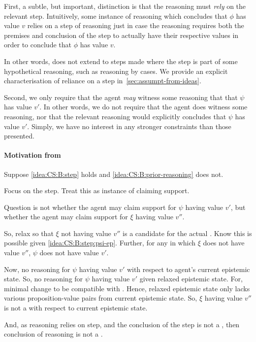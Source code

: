 \begin{note}
  First, a subtle, but important, distinction is that the reasoning must \emph{rely} on the relevant step.
  Intuitively, some instance of reasoning which concludes that \(\phi\) has value \(v\) relies on a step of reasoning just in case the reasoning requires both the premises and conclusion of the step to actually have their respective values in order to conclude that \(\phi\) has value \(v\).

  In other words, \ideaCSB{} does not extend to steps made where the step is part of some hypothetical reasoning, such as reasoning by cases.
  We provide an explicit characterisation of reliance on a step in~\autoref{sec:assumpt-from-ideas}.
\end{note}

\begin{note}
  Second, we only require that the agent \emph{may} witness some reasoning that \emph{} that \(\psi\) has value \(v'\).
  In other words, we do not require that the agent does witness some reasoning, nor that the relevant reasoning would explicitly concludes that \(\psi\) has value \(v'\).
  Simply, we have no interest in any stronger constraints than those presented.
\end{note}


\paragraph{Motivation from \ideaCSA{}}

\begin{note}
  Suppose \ref{idea:CS:B:step} holds and \ref{idea:CS:B:prior-reasoning} does not.


  Focus on the step.
  Treat this as instance of claiming support.

  Question is not whether the agent may claim support for \(\psi\) having value \(v'\), but whether the agent may claim support for \(\xi\) having value \(v''\).

  So, relax so that \(\xi\) not having value \(v''\) is a candidate for the actual \world{}.
  Know this is possible given \ref{idea:CS:B:step:psi-ep}.
  Further, for any \epAdv{} \world{} in which \(\xi\) does not have value \(v''\), \(\psi\) does not have value \(v'\).

  Now, no reasoning for \(\psi\) having value \(v'\) with respect to agent's current epistemic state.
  So, no reasoning for \(\psi\) having value \(v'\) given relaxed epistemic state.
  For, minimal change to be compatible with \epAdv{} \world{}.
  Hence, relaxed epistemic state only lacks various proposition-value pairs from current epistemic state.
  So, \(\xi\) having value \(v''\) is not a \sink{} with respect to current epistemic state.

  And, as reasoning relies on step, and the conclusion of the step is not a \sink{}, then conclusion of reasoning is not a \sink{}.
\end{note}

